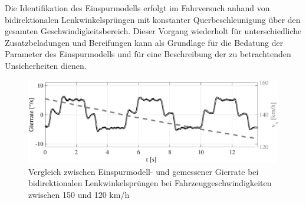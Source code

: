 Die Identifikation des Einspurmodells erfolgt im Fahrversuch anhand von bidirektionalen Lenkwinkelsprüngen mit konstanter Querbeschleunigung über den gesamten Geschwindigkeitsbereich. Dieser Vorgang wiederholt für unterschiedliche Zusatzbeladungen und Bereifungen kann als Grundlage für die Bedatung der Parameter des Einspurmodells und für eine Beschreibung der zu betrachtenden Unsicherheiten dienen. 
\begin{figure}[thpb]
 	 \centering
	   \includegraphics[width=12cm]{Bilder/ESM/esm_bidi_erg.eps} 
      \begin{center}
       \caption{Vergleich zwischen Einspurmodell- und gemessener Gierrate bei bidirektionalen Lenkwinkelsprüngen bei Fahrzeuggeschwindigkeiten zwischen 150 und 120 km/h}
     		 \label{abb_ident_esm}
       \end{center}
\end{figure}      


